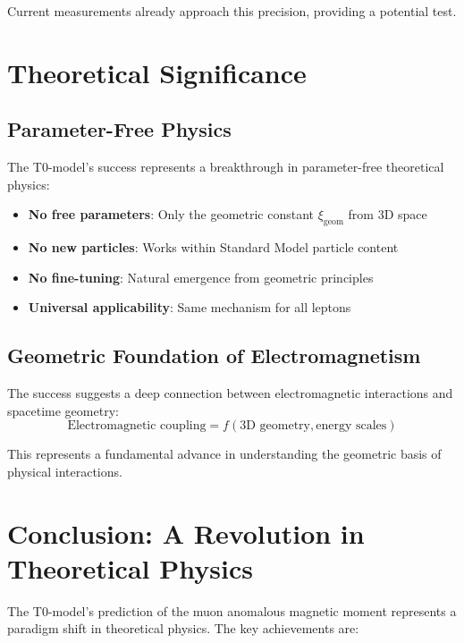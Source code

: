 \documentclass[12pt,a4paper]{report}
\newcommand{\xigeom}{\xi_{\text{geom}}}   %
\begin{document}
Current measurements already approach this precision, providing a potential test.

\section{Theoretical Significance}
\label{sec:theoretical_significance}

\subsection{Parameter-Free Physics}
\label{subsec:parameter_free_physics}

The T0-model's success represents a breakthrough in parameter-free theoretical physics:
\begin{itemize}
	\item \textbf{No free parameters}: Only the geometric constant $\xigeom$ from 3D space
	\item \textbf{No new particles}: Works within Standard Model particle content
	\item \textbf{No fine-tuning}: Natural emergence from geometric principles
	\item \textbf{Universal applicability}: Same mechanism for all leptons
\end{itemize}

\subsection{Geometric Foundation of Electromagnetism}
\label{subsec:geometric_electromagnetism}

The success suggests a deep connection between electromagnetic interactions and spacetime geometry:
\begin{equation}
	\text{Electromagnetic coupling} = f(\text{3D geometry}, \text{energy scales})
	\label{eq:electromagnetic_geometry}
\end{equation}

This represents a fundamental advance in understanding the geometric basis of physical interactions.

\section{Conclusion: A Revolution in Theoretical Physics}
\label{sec:conclusion}

The T0-model's prediction of the muon anomalous magnetic moment represents a paradigm shift in theoretical physics. The key achievements are:
\end{document}
